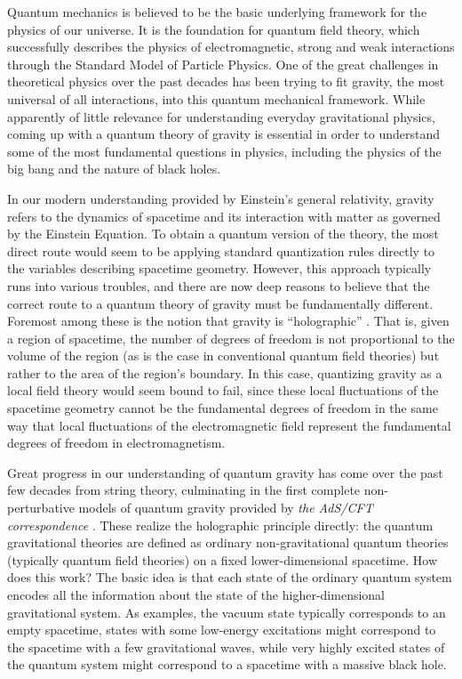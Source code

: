 \documentclass[12pt,epsf]{article}
\begin{document}
Quantum mechanics is believed to be the basic underlying framework for the physics of our universe. It is the foundation for quantum field theory, which successfully describes the physics of electromagnetic, strong and weak interactions through the Standard Model of Particle Physics.
One of the great challenges in theoretical physics over the past decades has been trying to fit gravity, the most universal of all interactions, into this quantum mechanical framework. While apparently of little relevance for understanding everyday gravitational physics, coming up with a quantum theory of gravity is essential in order to understand some of the most fundamental questions in physics, including the physics of the big bang and the nature of black holes.

In our modern understanding provided by Einstein's general relativity, gravity refers to the dynamics of spacetime and its interaction with matter as governed by the Einstein Equation. To obtain a quantum version of the theory, the most direct route would seem to be applying standard quantization rules directly to the variables describing spacetime geometry. However, this approach typically runs into various troubles, and there are now deep reasons to believe that the correct route to a quantum theory of gravity must be fundamentally different. Foremost among these is the notion that gravity is ``holographic'' \cite{'tHooft:1993gx,Susskind:1994vu}. That is, given a region of spacetime, the number of degrees of freedom is not proportional to the volume of the region (as is the case in conventional quantum field theories) but rather to the area of the region's boundary. In this case, quantizing gravity as a local field theory would seem bound to fail, since these local fluctuations of the spacetime geometry cannot be the fundamental degrees of freedom in the same way that local fluctuations of the electromagnetic field represent the fundamental degrees of freedom in electromagnetism.

Great progress in our understanding of quantum gravity has come over the past few decades from string theory, culminating in the first complete non-perturbative models of quantum gravity provided by {\it the AdS/CFT correspondence} \cite{maldacena1997large}. These realize the holographic principle directly: the quantum gravitational theories are defined as ordinary non-gravitational quantum theories (typically quantum field theories) on a fixed lower-dimensional spacetime. How does this work? The basic idea is that each state of the ordinary quantum system encodes all the information about the state of the higher-dimensional gravitational system. As examples, the vacuum state typically corresponds to an empty spacetime, states with some low-energy excitations might correspond to the spacetime with a few gravitational waves, while very highly excited states of the quantum system might correspond to a spacetime with a massive black hole.
\end{document}
